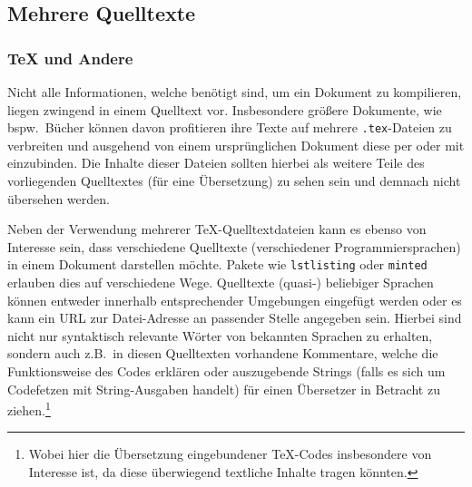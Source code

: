 \subsection{Mehrere Quelltexte}


\subsubsection{\TeX{} und Andere}
Nicht alle Informationen, welche benötigt sind, um ein Dokument zu kompilieren, liegen zwingend in einem Quelltext vor. Insbesondere größere Dokumente, wie bspw.\ Bücher können davon profitieren ihre Texte auf mehrere \verb|.tex|-Dateien zu verbreiten und ausgehend von einem ursprünglichen Dokument diese per \verb|| oder \verb|| mit einzubinden. Die Inhalte dieser Dateien sollten hierbei als weitere Teile des vorliegenden Quelltextes (für eine Übersetzung) zu sehen sein und demnach nicht übersehen werden.%
\begin{comment}
    - Kurzfassung - 
    Datei 1:
        \documentclass{article}
        \title{sample}
        
        
        
        
    Datei sample.tex:
        Will i be translated?

    Erwarteter Output:
        Werde ich übersetzt?
        (nächste Seite)
        Werde ich übersetzt?
\end{comment}

Neben der Verwendung mehrerer \TeX{}-Quelltextdateien kann es ebenso von Interesse sein, dass verschiedene Quelltexte (verschiedener Programmiersprachen) in einem Dokument darstellen möchte. Pakete wie \texttt{lstlisting} oder \texttt{minted} erlauben dies auf verschiedene Wege. Quelltexte (quasi-) beliebiger Sprachen können entweder innerhalb entsprechender Umgebungen eingefügt werden oder es kann ein URL zur Datei-Adresse an passender Stelle angegeben sein. Hierbei sind nicht nur syntaktisch relevante Wörter von bekannten Sprachen zu erhalten, sondern auch z.B.\ in diesen Quelltexten vorhandene Kommentare, welche die Funktionsweise des Codes erklären oder auszugebende Strings (falls es sich um Codefetzen mit String-Ausgaben handelt) für einen Übersetzer in Betracht zu ziehen.\footnote{Wobei hier die Übersetzung eingebundener \TeX{}-Codes insbesondere von Interesse ist, da diese überwiegend textliche Inhalte tragen könnten.}


